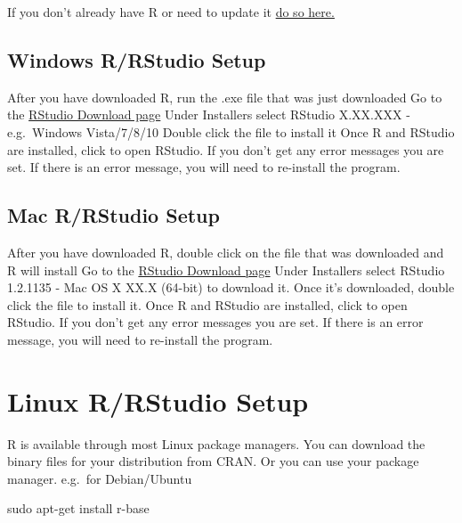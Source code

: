 \documentclass[
  letterpaper,
]{book}
\newenvironment{Shaded}{\begin{snugshade}}{\end{snugshade}}
\newcommand{\FunctionTok}[1]{\textcolor[rgb]{0.28,0.35,0.67}{#1}}
\newcommand{\NormalTok}[1]{\textcolor[rgb]{0.00,0.23,0.31}{#1}}
\begin{document}
If you don't already have R or need to update it
\href{https://cran.rstudio.com/}{do so here.}

\subsection*{Windows R/RStudio Setup}\label{windows-rrstudio-setup}

After you have downloaded R, run the .exe file that was just downloaded
Go to the
\href{https://www.rstudio.com/products/rstudio/download/\#download}{RStudio
Download page} Under Installers select RStudio X.XX.XXX - e.g.~Windows
Vista/7/8/10 Double click the file to install it Once R and RStudio are
installed, click to open RStudio. If you don't get any error messages
you are set. If there is an error message, you will need to re-install
the program.

\subsection*{Mac R/RStudio Setup}\label{mac-rrstudio-setup}

After you have downloaded R, double click on the file that was
downloaded and R will install Go to the
\href{https://www.rstudio.com/products/rstudio/download/\#download}{RStudio
Download page} Under Installers select RStudio 1.2.1135 - Mac OS X XX.X
(64-bit) to download it. Once it's downloaded, double click the file to
install it. Once R and RStudio are installed, click to open RStudio. If
you don't get any error messages you are set. If there is an error
message, you will need to re-install the program.

\section*{Linux R/RStudio Setup}\label{linux-rrstudio-setup}


R is available through most Linux package managers. You can download the
binary files for your distribution from CRAN. Or you can use your
package manager. e.g.~for Debian/Ubuntu

\begin{Shaded}
\begin{Highlighting}[]
\FunctionTok{sudo}\NormalTok{ apt{-}get install r{-}base}
\end{Highlighting}
\end{Shaded}
\end{document}
